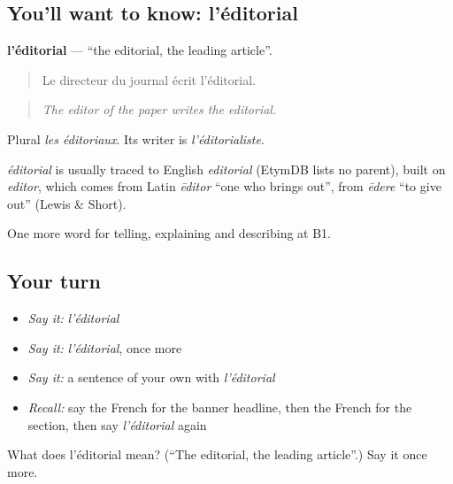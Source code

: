 \subsection*{You'll want to know: l'éditorial}
\textbf{l'éditorial} — \textquotedblleft{}the editorial, the leading article\textquotedblright{}.

\begin{quote}
Le directeur du journal écrit l'éditorial.
\end{quote}

\begin{quote}
\emph{The editor of the paper writes the editorial.}
\end{quote}

Plural \emph{les éditoriaux}. Its writer is \emph{l'éditorialiste}.

\begin{cousinweb}
\emph{éditorial} is usually traced to English \emph{editorial} (EtymDB lists no parent), built on \emph{editor}, which comes from Latin \emph{ēditor} \textquotedblleft{}one who brings out\textquotedblright{}, from \emph{ēdere} \textquotedblleft{}to give out\textquotedblright{} (Lewis \& Short).
\end{cousinweb}

\begin{grammarlens}[title={What you've built}]
One more word for telling, explaining and describing at B1.
\end{grammarlens}

\subsection*{Your turn}
\begin{itemize}
\raggedright
  \item \emph{Say it:} \emph{l'éditorial}
  \item \emph{Say it:} \emph{l'éditorial}, once more
  \item \emph{Say it:} a sentence of your own with \emph{l'éditorial}
  \item \emph{Recall:} say the French for the banner headline, then the French for the section, then say \emph{l'éditorial} again
\end{itemize}

\begin{tcolorbox}[breakable,colback=teal!4,colframe=teal!35!black,title={Before you move on}]
What does l'éditorial mean? (\textquotedblleft{}The editorial, the leading article\textquotedblright{}.) Say it once more.
\end{tcolorbox}
